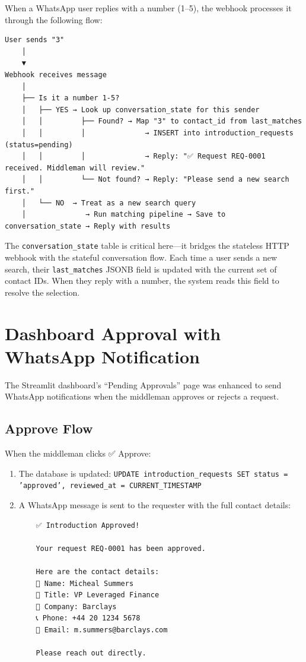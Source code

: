 \documentclass[12pt, a4paper]{report}
\begin{document}
When a WhatsApp user replies with a number (1--5), the webhook processes it through the following flow:

\begin{verbatim}
User sends "3"
    │
    ▼
Webhook receives message
    │
    ├── Is it a number 1-5?
    │   ├── YES → Look up conversation_state for this sender
    │   │         ├── Found? → Map "3" to contact_id from last_matches
    │   │         │              → INSERT into introduction_requests (status=pending)
    │   │         │              → Reply: "✅ Request REQ-0001 received. Middleman will review."
    │   │         └── Not found? → Reply: "Please send a new search first."
    │   └── NO  → Treat as a new search query
    │              → Run matching pipeline → Save to conversation_state → Reply with results
\end{verbatim}

The \texttt{conversation\_state} table is critical here---it bridges the stateless HTTP webhook with the stateful conversation flow. Each time a user sends a new search, their \texttt{last\_matches} JSONB field is updated with the current set of contact IDs. When they reply with a number, the system reads this field to resolve the selection.

\section{Dashboard Approval with WhatsApp Notification}

The Streamlit dashboard's ``Pending Approvals'' page was enhanced to send WhatsApp notifications when the middleman approves or rejects a request.

\subsection{Approve Flow}

When the middleman clicks ✅ Approve:

\begin{enumerate}[itemsep=3pt]
    \item The database is updated: \texttt{UPDATE introduction\_requests SET status = 'approved', reviewed\_at = CURRENT\_TIMESTAMP}
    \item A WhatsApp message is sent to the requester with the full contact details:
    \begin{verbatim}
    ✅ Introduction Approved!

    Your request REQ-0001 has been approved.

    Here are the contact details:
    👤 Name: Micheal Summers
    💼 Title: VP Leveraged Finance
    🏢 Company: Barclays
    📞 Phone: +44 20 1234 5678
    📧 Email: m.summers@barclays.com

    Please reach out directly.
    \end{verbatim}
\end{enumerate}
\end{document}
